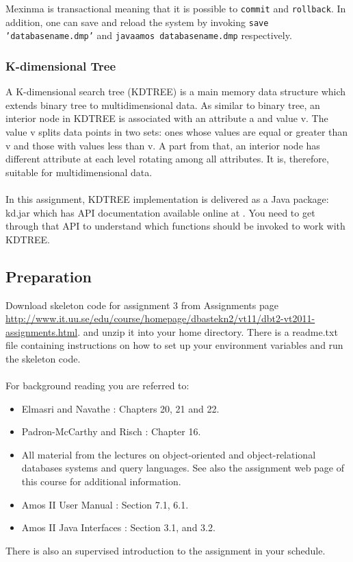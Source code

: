 \documentclass[12pt]{article}
\begin{document}
Mexinma is transactional meaning that it is possible to \texttt{commit} and \texttt{rollback}. In addition, one can save and reload the system by invoking \texttt{save 'databasename.dmp'} and \texttt{javaamos databasename.dmp} respectively.

\subsubsection{K-dimensional Tree}
A K-dimensional search tree (KDTREE) is a main memory data structure which extends binary tree to multidimensional data. As similar to binary tree, an interior node in KDTREE is associated with an attribute a and value v. The value v splits data points in two sets: ones whose values are equal or greater than v and those with values less than v. A part from that, an interior node has different attribute at each level rotating among all attributes. It is, therefore, suitable for multidimensional data.\\\\
In this assignment, KDTREE implementation is delivered as a Java package: kd.jar which has API documentation available online at \cite{LEV11}. You need to get through that API to understand which functions should be invoked to work with KDTREE.

\subsection{Preparation}

Download skeleton code for assignment 3 from Assignments page \url{http://www.it.uu.se/edu/course/homepage/dbastekn2/vt11/dbt2-vt2011-assignments.html}. and unzip it into your home directory. There is a readme.txt file containing instructions on how to set up your environment variables and run the skeleton code.\\\\
For background reading you are referred to:

\begin{itemize}
\item Elmasri and Navathe \cite{EN10}: Chapters 20, 21 and 22.
\item Padron-McCarthy and Risch \cite{PMR05}: Chapter 16.
\item All material from the lectures on object-oriented and object-relational databases systems and query languages. See also the assignment web page of this course for additional information.
\item Amos II User Manual \cite{AmosII}: Section 7.1, 6.1.
\item Amos II Java Interfaces \cite{AmosIIJava}: Section 3.1, and 3.2.
\end{itemize}
There is also an supervised introduction to the assignment in your schedule.
\end{document}
